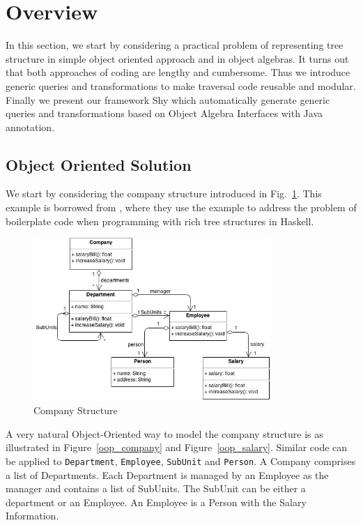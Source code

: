 \section{Overview}\label{subsec:overview}


In this section, we start by considering a practical problem of representing tree structure in simple object oriented approach and in object algebras. It turns out that both approaches of coding are lengthy and cumbersome. Thus we introduce generic queries and transformations to make traversal code reusable and modular. Finally we present our framework Shy which automatically generate generic queries and transformations based on Object Algebra Interfaces with Java annotation.

\subsection{Object Oriented Solution}


We start by considering the company structure introduced in
Fig.~\ref{company_structure}. This example is borrowed from \cite{ralf03syb}, where they use the example to address the problem of boilerplate code when programming with rich tree structures in Haskell. 

\begin{figure}[ht!]
\centering
\includegraphics[width=90mm]{Company.jpg}
\caption{Company Structure \label{company_structure}}
\end{figure}

A very natural Object-Oriented way to model the company structure is
as illustrated in Figure~\ref{oop_company} and
Figure~\ref{oop_salary}. Similar code can be applied to
\lstinline{Department},
\lstinline{Employee}, \lstinline{SubUnit} and \lstinline{Person}. A Company comprises a list of
Departments. Each Department is managed by an Employee as the manager
and contains a list of SubUnits. The SubUnit can be either a
department or an Employee. An Employee is a Person with the Salary
Information.

